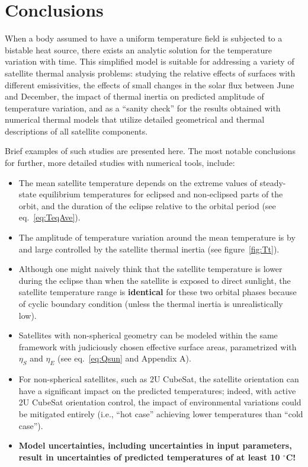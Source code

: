 \documentclass[]{aastex62}
\begin{document}
\section{Conclusions} 

When a body assumed to have a uniform temperature field is subjected to a bistable heat source,
there exists an analytic solution for the temperature variation with time. This simplified model is 
suitable for addressing a variety of satellite thermal analysis problems: studying the relative effects 
of surfaces with different emissivities, the effects of small changes in the solar flux between June 
and December, the impact of thermal inertia on predicted amplitude of temperature variation, and 
as a ``sanity check'' for the results obtained with numerical thermal models that utilize detailed 
geometrical and thermal descriptions of all satellite components. 

Brief examples of such studies are presented here. The most notable conclusions for further,
more detailed studies with numerical tools, include:
\begin{itemize}
\item The mean satellite temperature depends on the extreme values of steady-state equilibrium 
    temperatures for eclipsed and non-eclipsed parts of the orbit, and the duration of the eclipse
    relative to the orbital period (see eq.~\ref{eq:TeqAve}). 
\item The amplitude of temperature variation around the mean temperature is by and large 
     controlled by the satellite thermal inertia (see figure~\ref{fig:Tt}).
\item Although one might naively think that the satellite temperature is lower during the eclipse
    than when the satellite is exposed to direct sunlight, the satellite temperature range is {\bf identical} 
    for these two orbital phases because of cyclic boundary condition (unless the thermal inertia 
    is unrealistically low). 
\item Satellites with non-spherical geometry can be modeled within the same framework with 
    judiciously chosen effective surface areas, parametrized with $\eta_S$ and $\eta_E$
    (see eq.~\ref{eq:Qsun} and Appendix A). 
\item For non-spherical satellites, such as 2U CubeSat, the satellite orientation can have a
    significant impact on the predicted temperatures; indeed, with active 2U CubeSat orientation 
    control, the impact of environmental variations could be mitigated entirely (i.e., ``hot case'' 
    achieving lower temperatures than ``cold case''). 
\item {\bf Model uncertainties, including uncertainties in input parameters, result in uncertainties
   of predicted temperatures of at least 10 $^\circ$C!} 
\end{itemize} 
\end{document}
